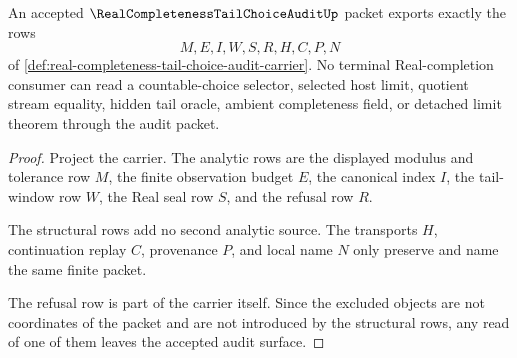 \begin{theorem}
\label{thm:real-completeness-tail-choice-audit-nonescape}
An accepted $\RealCompletenessTailChoiceAuditUp$ packet exports exactly the rows
$$
M,E,I,W,S,R,H,C,P,N
$$
of \autoref{def:real-completeness-tail-choice-audit-carrier}. No terminal Real-completion consumer can read a countable-choice selector, selected host limit, quotient stream equality, hidden tail oracle, ambient completeness field, or detached limit theorem through the audit packet.
\end{theorem}
\begin{proof}
Project the carrier. The analytic rows are the displayed modulus and tolerance row $M$, the finite observation budget $E$, the canonical index $I$, the tail-window row $W$, the Real seal row $S$, and the refusal row $R$.

The structural rows add no second analytic source. The transports $H$, continuation replay $C$, provenance $P$, and local name $N$ only preserve and name the same finite packet.

The refusal row is part of the carrier itself. Since the excluded objects are not coordinates of the packet and are not introduced by the structural rows, any read of one of them leaves the accepted audit surface.
\end{proof}

